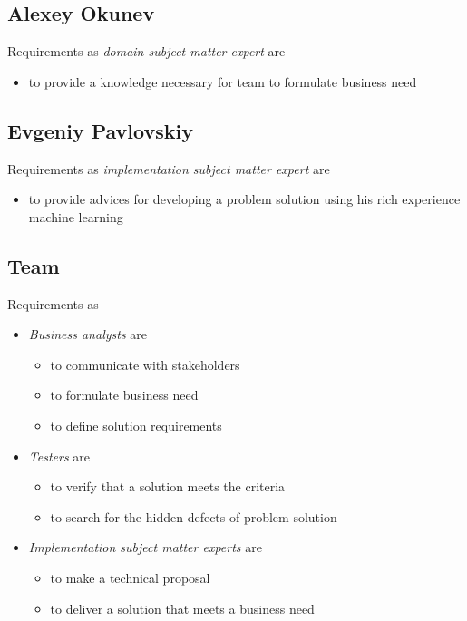 \subsection{Alexey Okunev}

Requirements as \textit{domain subject matter expert} are
\begin{itemize}
	\item to provide a knowledge necessary for team to formulate business need
\end{itemize}

\subsection{Evgeniy Pavlovskiy}

Requirements as \textit{implementation subject matter expert} are
\begin{itemize}
	\item to provide advices for developing a problem solution using his rich experience machine learning
\end{itemize}



\subsection{Team}
Requirements as
\begin{itemize}
	\item \textit{Business analysts} are
	\begin{itemize}
		\item to communicate with stakeholders
		\item to formulate business need
		\item to define solution requirements
	\end{itemize}
	\item \textit{Testers} are
	\begin{itemize}
		\item to verify that a solution meets the criteria
		\item to search for the hidden defects of problem solution
	\end{itemize}
	\item \textit{Implementation subject matter experts} are
	\begin{itemize}
		\item to make a technical proposal
		\item to deliver a solution that meets a business need
	\end{itemize}
\end{itemize}

